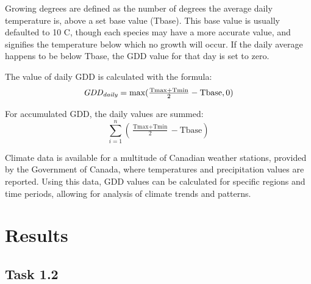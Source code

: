 \documentclass[12pt]{article}
\begin{document}
Growing degrees are defined as the number of degrees the average daily 
temperature is, above a set base value (Tbase). This base value is 
usually defaulted to 10 \degree C, though each species may have a more 
accurate value, and signifies the temperature below which no growth 
will occur. If the daily average happens to be below Tbase, the GDD 
value for that day is set to zero. \\

\bigskip
\par

The value of daily GDD is calculated with the formula:
$$
\textit{GDD\textsubscript{daily}} =  \text{max}( \tfrac{\text{Tmax}+\text{Tmin}}{2}-\text{Tbase}, 0)
$$

\bigskip
\bigskip

For accumulated GDD, the daily values are summed:
$$
\sum_{i=1}^n ( \tfrac{\text{Tmax}+\text{Tmin}}{2}-\text{Tbase})
$$

\bigskip

\par
Climate data is available for a multitude of Canadian weather stations, provided
by the Government of Canada, where temperatures and precipitation values are reported. 
Using this data, GDD values can be calculated for 
specific regions and time periods, allowing for analysis of climate trends and patterns. 



\pagebreak

\section{Results}\label{data analysis}
\subsection{Task 1.2}
\end{document}
